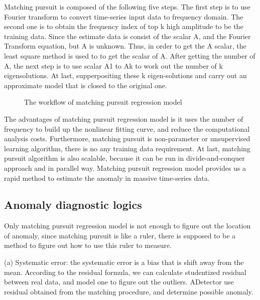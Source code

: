 \documentclass{vgtc}                          %
\begin{document}
Matching pursuit is composed of the following five steps. The first step is to use Fourier transform to convert time-series input data to frequency domain. The second one is to obtain the frequency index of top k high amplitude to be the training data. Since the estimate data is consist of the scalar A, and the Fourier Transform equation, but A is unknown. Thus, in order to get the A scalar, the least square method is used to to get the scalar of A. After getting the number of A, the next step is to use scalar A1 to Ak to work out the number of k eigensolutions. At last, supperpositing these k eigen-solutions and carry out an approximate model that is closed to the original one.

\begin{figure}[htb]
	\caption{The workflow of matching pursuit regression model}
	\label{fig:fft}
\end{figure}

The advantages of matching pursuit regression model is it uses the number of frequency to build up the nonlinear fitting curve, and reduce the computational analysis costs. Furthermore, matching pursuit is non-parameter or unsupervised learning algorithm, there is no any training data requirement. At last, matching pursuit algorithm is also scalable, because it can be run in divide-and-conquer approach and in parallel way. Matching pursuit regression model provides us a rapid method to estimate the anomaly in massive time-series data. 

\subsection{Anomaly diagnostic logics}
Only matching pursuit regression model is not enough to figure out the location of anomaly, since matching pursuit is like a ruler, there is supposed to be a method to figure out how to use this ruler to measure.
	
(a) Systematic error: the systematic error is a bias that is shift away from the mean. According to the residual formula, we can calculate studentized residual between real data, and model one to figure out the outliers. ADetector use residual obtained from the matching procedure, and determine possible anomaly.
			
\end{document}

